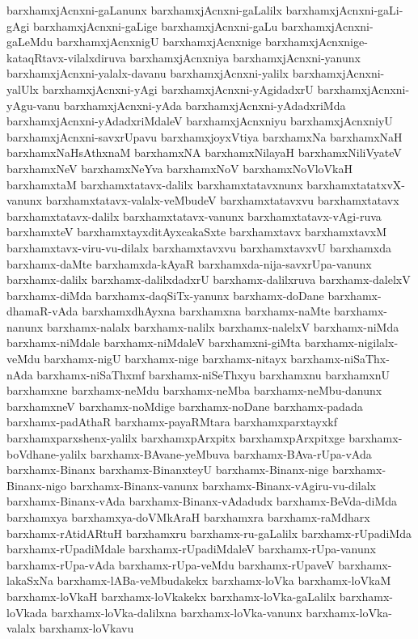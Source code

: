 {barxhamxjAcnxni-gaLanunx
barxhamxjAcnxni-gaLalilx
barxhamxjAcnxni-gaLi-gAgi
barxhamxjAcnxni-gaLige
barxhamxjAcnxni-gaLu
barxhamxjAcnxni-gaLeMdu
barxhamxjAcnxnigU
barxhamxjAcnxnige
barxhamxjAcnxnige-kataqRtavx-vilalxdiruva
barxhamxjAcnxniya
barxhamxjAcnxni-yanunx
barxhamxjAcnxni-yalalx-davanu
barxhamxjAcnxni-yalilx
barxhamxjAcnxni-yalUlx
barxhamxjAcnxni-yAgi
barxhamxjAcnxni-yAgidadxrU
barxhamxjAcnxni-yAgu-vanu
barxhamxjAcnxni-yAda
barxhamxjAcnxni-yAdadxriMda
barxhamxjAcnxni-yAdadxriMdaleV
barxhamxjAcnxniyu
barxhamxjAcnxniyU
barxhamxjAcnxni-savxrUpavu
barxhamxjoyxVtiya
barxhamxNa
barxhamxNaH
barxhamxNaHsAthxnaM
barxhamxNA
barxhamxNilayaH
barxhamxNiliVyateV
barxhamxNeV
barxhamxNeYva
barxhamxNoV
barxhamxNoVloVkaH
barxhamxtaM
barxhamxtatavx-dalilx
barxhamxtatavxnunx
barxhamxtatatxvX-vanunx
barxhamxtatavx-valalx-veMbudeV
barxhamxtatavxvu
barxhamxtatavx
barxhamxtatavx-dalilx
barxhamxtatavx-vanunx
barxhamxtatavx-vAgi-ruva
barxhamxteV
barxhamxtayxditAyxcakaSxte
barxhamxtavx
barxhamxtavxM
barxhamxtavx-viru-vu-dilalx
barxhamxtavxvu
barxhamxtavxvU
barxhamxda
barxhamx-daMte
barxhamxda-kAyaR
barxhamxda-nija-savxrUpa-vanunx
barxhamx-dalilx
barxhamx-dalilxdadxrU
barxhamx-dalilxruva
barxhamx-dalelxV
barxhamx-diMda
barxhamx-daqSiTx-yanunx
barxhamx-doDane
barxhamx-dhamaR-vAda
barxhamxdhAyxna
barxhamxna
barxhamx-naMte
barxhamx-nanunx
barxhamx-nalalx
barxhamx-nalilx
barxhamx-nalelxV
barxhamx-niMda
barxhamx-niMdale
barxhamx-niMdaleV
barxhamxni-giMta
barxhamx-nigilalx-veMdu
barxhamx-nigU
barxhamx-nige
barxhamx-nitayx
barxhamx-niSaThx-nAda
barxhamx-niSaThxmf
barxhamx-niSeThxyu
barxhamxnu
barxhamxnU
barxhamxne
barxhamx-neMdu
barxhamx-neMba
barxhamx-neMbu-danunx
barxhamxneV
barxhamx-noMdige
barxhamx-noDane
barxhamx-padada
barxhamx-padAthaR
barxhamx-payaRMtara
barxhamxparxtayxkf
barxhamxparxshenx-yalilx
barxhamxpArxpitx
barxhamxpArxpitxge
barxhamx-boVdhane-yalilx
barxhamx-BAvane-yeMbuva
barxhamx-BAva-rUpa-vAda
barxhamx-Binanx
barxhamx-BinanxteyU
barxhamx-Binanx-nige
barxhamx-Binanx-nigo
barxhamx-Binanx-vanunx
barxhamx-Binanx-vAgiru-vu-dilalx
barxhamx-Binanx-vAda
barxhamx-Binanx-vAdadudx
barxhamx-BeVda-diMda
barxhamxya
barxhamxya-doVMkAraH
barxhamxra
barxhamx-raMdharx
barxhamx-rAtidARtuH
barxhamxru
barxhamx-ru-gaLalilx
barxhamx-rUpadiMda
barxhamx-rUpadiMdale
barxhamx-rUpadiMdaleV
barxhamx-rUpa-vanunx
barxhamx-rUpa-vAda
barxhamx-rUpa-veMdu
barxhamx-rUpaveV
barxhamx-lakaSxNa
barxhamx-lABa-veMbudakekx
barxhamx-loVka
barxhamx-loVkaM
barxhamx-loVkaH
barxhamx-loVkakekx
barxhamx-loVka-gaLalilx
barxhamx-loVkada
barxhamx-loVka-dalilxna
barxhamx-loVka-vanunx
barxhamx-loVka-valalx
barxhamx-loVkavu
}
